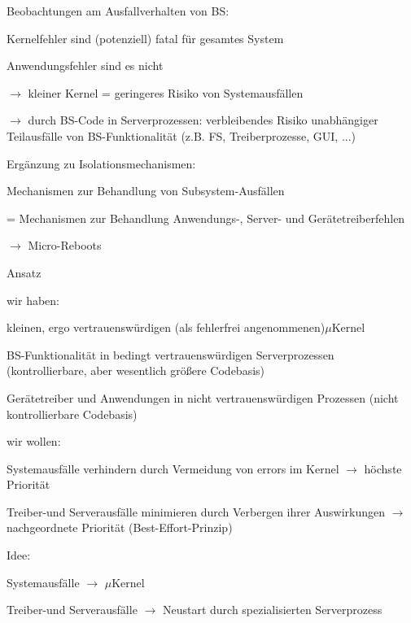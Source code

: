 \documentclass[a4paper]{article}
\begin{document}
\begin{multicols}{3}
    \begin{itemize*}
        \item
        Beobachtungen am Ausfallverhalten von BS:
        \item
        Kernelfehler sind (potenziell) fatal für gesamtes System
        \item
        Anwendungsfehler sind es nicht
        \item
        $\rightarrow$ kleiner Kernel = geringeres Risiko von
        Systemausfällen
        \item
        $\rightarrow$ durch BS-Code in Serverprozessen:
        verbleibendes Risiko unabhängiger Teilausfälle von BS-Funktionalität
        (z.B. FS, Treiberprozesse, GUI, ...)
        \item
        Ergänzung zu Isolationsmechanismen:
        \item
        Mechanismen zur Behandlung von Subsystem-Ausfällen
        \item
        = Mechanismen zur Behandlung Anwendungs-, Server- und
        Gerätetreiberfehlen
        \item
        $\rightarrow$ Micro-Reboots
    \end{itemize*}

    Ansatz

    \begin{itemize*}
        \item
        wir haben:
        \item
        kleinen, ergo vertrauenswürdigen (als fehlerfrei angenommenen)$\mu$Kernel
        \item
        BS-Funktionalität in bedingt vertrauenswürdigen Serverprozessen
        (kontrollierbare, aber wesentlich größere Codebasis)
        \item
        Gerätetreiber und Anwendungen in nicht vertrauenswürdigen Prozessen
        (nicht kontrollierbare Codebasis)
        \item
        wir wollen:
        \item
        Systemausfälle verhindern durch Vermeidung von errors im Kernel
        $\rightarrow$ höchste Priorität
        \item
        Treiber-und Serverausfälle minimieren durch Verbergen ihrer
        Auswirkungen $\rightarrow$ nachgeordnete Priorität
        (Best-Effort-Prinzip)
        \item
        Idee:
        \begin{itemize*}
            \item Systemausfälle $\rightarrow$ $\mu$Kernel
            \item Treiber-und Serverausfälle $\rightarrow$ Neustart durch spezialisierten Serverprozess
        \end{itemize*}
    \end{itemize*}


\end{multicols}
\end{document}
